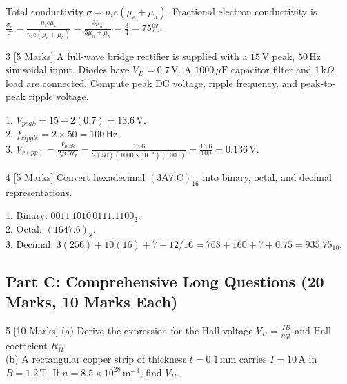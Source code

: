 \begin{solbox}
Total conductivity $\sigma = n_i e(\mu_e + \mu_h)$. Fractional electron conductivity is $\frac{\sigma_e}{\sigma} = \frac{n_i e \mu_e}{n_i e(\mu_e + \mu_h)} = \frac{3\mu_h}{3\mu_h + \mu_h} = \frac{3}{4} = 75\%$.
\end{solbox}

\begin{examqbox}{3 [5 Marks]}
A full-wave bridge rectifier is supplied with a $15\,\text{V}$ peak, $50\,\text{Hz}$ sinusoidal input. Diodes have $V_D = 0.7\,\text{V}$. A $1000\,\mu\text{F}$ capacitor filter and $1\,\text{k}\Omega$ load are connected. Compute peak DC voltage, ripple frequency, and peak-to-peak ripple voltage.
\end{examqbox}

\begin{solbox}
1. $V_{peak} = 15 - 2(0.7) = 13.6\,\text{V}$.\\
2. $f_{ripple} = 2 \times 50 = 100\,\text{Hz}$.\\
3. $V_{r(pp)} = \frac{V_{peak}}{2 f C R_L} = \frac{13.6}{2(50)(1000 \times 10^{-6})(1000)} = \frac{13.6}{100} = 0.136\,\text{V}$.
\end{solbox}

\begin{examqbox}{4 [5 Marks]}
Convert hexadecimal $(3\text{A}7.\text{C})_{16}$ into binary, octal, and decimal representations.
\end{examqbox}

\begin{solbox}
1. Binary: $0011\,1010\,0111.1100_2$.\\
2. Octal: $(1647.6)_8$.\\
3. Decimal: $3(256) + 10(16) + 7 + 12/16 = 768 + 160 + 7 + 0.75 = 935.75_{10}$.
\end{solbox}

\subsection*{Part C: Comprehensive Long Questions (20 Marks, 10 Marks Each)}

\begin{examqbox}{5 [10 Marks]}
(a) Derive the expression for the Hall voltage $V_H = \frac{IB}{nqt}$ and Hall coefficient $R_H$.\\
(b) A rectangular copper strip of thickness $t = 0.1\,\text{mm}$ carries $I = 10\,\text{A}$ in $B = 1.2\,\text{T}$. If $n = 8.5 \times 10^{28}\,\text{m}^{-3}$, find $V_H$.
\end{examqbox}

